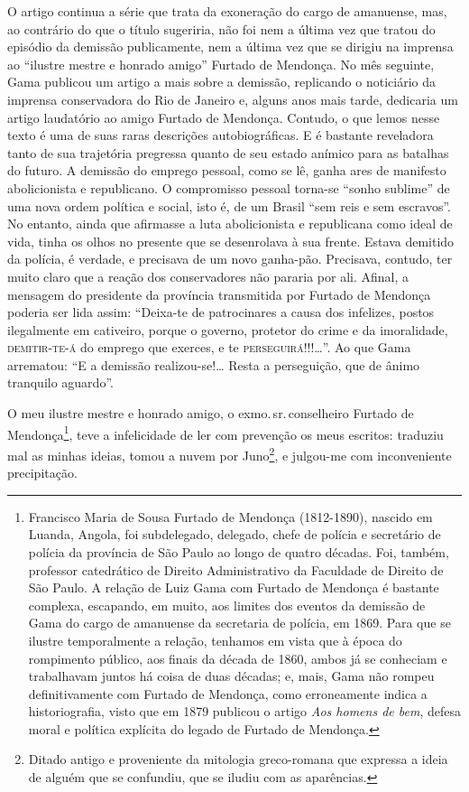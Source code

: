 \begin{didascalia}
O artigo continua a série que trata da exoneração do cargo de amanuense,
mas, ao contrário do que o título sugeriria, não foi nem a última vez
que tratou do episódio da demissão publicamente, nem a última vez que se
dirigiu na imprensa ao ``ilustre mestre e honrado amigo'' Furtado de
Mendonça. No mês seguinte, Gama publicou um artigo a mais sobre a
demissão, replicando o noticiário da imprensa conservadora do Rio de
Janeiro e, alguns anos mais tarde, dedicaria um artigo laudatório ao
amigo Furtado de Mendonça. Contudo, o que lemos nesse texto é uma de
suas raras descrições autobiográficas. E é bastante reveladora tanto de
sua trajetória pregressa quanto de seu estado anímico para as batalhas
do futuro. A demissão do emprego pessoal, como se lê, ganha ares de
manifesto abolicionista e republicano. O compromisso pessoal torna-se
``sonho sublime'' de uma nova ordem política e social, isto é, de um
Brasil ``sem reis e sem escravos''. No entanto, ainda que afirmasse a luta
abolicionista e republicana como ideal de vida, tinha os olhos no
presente que se desenrolava à sua frente. Estava demitido da polícia, é
verdade, e precisava de um novo ganha-pão. Precisava, contudo, ter muito
claro que a reação dos conservadores não pararia por ali. Afinal, a
mensagem do presidente da província transmitida por Furtado de Mendonça
poderia ser lida assim: ``Deixa-te de patrocinares a causa dos infelizes,
postos ilegalmente em cativeiro, porque o governo, protetor do crime e
da imoralidade, \textsc{demitir-te-á} do emprego que exerces, e te
\textsc{perseguirá}!!!\ldots{}''. Ao que Gama arrematou: ``E a demissão realizou-se!\ldots{}
Resta a perseguição, que de ânimo tranquilo aguardo''.
\end{didascalia}



O meu ilustre mestre e honrado amigo, o exmo.\,sr.\,conselheiro Furtado de
Mendonça\footnote{Francisco Maria de Sousa Furtado de Mendonça
  (1812-1890), nascido em Luanda, Angola, foi subdelegado, delegado,
  chefe de polícia e secretário de polícia da província de São Paulo ao
  longo de quatro décadas. Foi, também, professor catedrático de Direito
  Administrativo da Faculdade de Direito de São Paulo. A relação de Luiz
  Gama com Furtado de Mendonça é bastante complexa, escapando, em muito,
  aos limites dos eventos da demissão de Gama do cargo de amanuense da
  secretaria de polícia, em 1869. Para que se ilustre temporalmente a
  relação, tenhamos em vista que à época do rompimento público, aos
  finais da década de 1860, ambos já se conheciam e trabalhavam juntos
  há coisa de duas décadas; e, mais, Gama não rompeu definitivamente com
  Furtado de Mendonça, como erroneamente indica a historiografia, visto
  que em 1879 publicou o artigo \emph{Aos homens de bem}, defesa moral e
  política explícita do legado de Furtado de Mendonça.}, teve a
infelicidade de ler com prevenção os meus escritos: traduziu mal as
minhas ideias, tomou a nuvem por Juno\footnote{Ditado antigo e
  proveniente da mitologia greco-romana que expressa a ideia de alguém
  que se confundiu, que se iludiu com as aparências.}, e julgou-me com
inconveniente precipitação.

